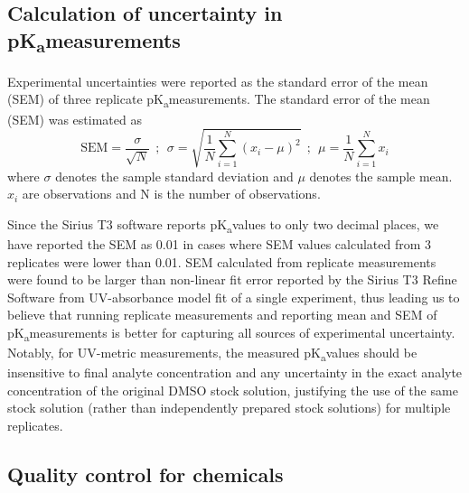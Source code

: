 \documentclass[9pt,lineno]{elife}
\newcommand{\pKa}{pK\textsubscript{a}}
\begin{document}
\subsection{Calculation of uncertainty in \pKa measurements}

Experimental uncertainties were reported as the standard error of the mean (SEM) of three replicate \pKa measurements. 
The standard error of the mean (SEM) was estimated as
\begin{equation}
\mathrm{SEM} = \frac{\sigma}{\sqrt{N}}  \:\: ; \:\: \sigma = \sqrt{\frac{1}{N} \sum_{i=1}^N (x_i - \mu)^2 } \:\: ; \:\: \mu = \frac{1}{N} \sum_{i=1}^N x_i
\label{eq:sem}
\end{equation}
where $\sigma$ denotes the sample standard deviation and $\mu$ denotes the sample mean. $x_i$ are observations and N is the number of observations. 

Since the Sirius T3 software reports \pKa values to only two decimal places, we have reported the SEM as 0.01 in cases where SEM values calculated from 3 replicates were lower than 0.01. 
SEM calculated from replicate measurements were found to be larger than non-linear fit error reported by the Sirius T3 Refine Software from UV-absorbance model fit of a single experiment, thus leading us to believe that running replicate measurements and reporting mean and SEM of \pKa measurements is better for capturing all sources of experimental uncertainty.
Notably, for UV-metric measurements, the measured \pKa values should be insensitive to final analyte concentration and any uncertainty in the exact analyte concentration of the original DMSO stock solution, justifying the use of the same stock solution (rather than independently prepared stock solutions) for multiple replicates.

\subsection{Quality control for chemicals}
\end{document}
